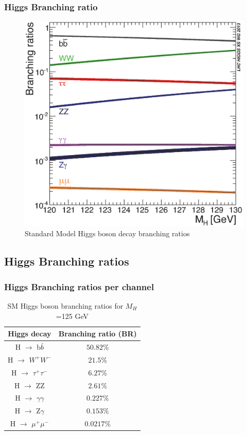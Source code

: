\documentclass[11pt]{beamer}
\begin{document}
\begin{frame}
\frametitle{Higgs Branching ratio}
\begin{center}
	\begin{figure}
		\includegraphics[scale=0.35]{figures/Higgs_BR_120-130_7.eps}
		\caption{Standard Model Higgs boson decay branching ratios}	
	\end{figure}
\end{center}
\end{frame}


\begin{frame}
\section{Higgs Branching ratios }
\frametitle{Higgs Branching ratios per channel}
\begin{table}
	\caption*{SM Higgs boson branching ratios for  $M_H$ =125 GeV}
\begin{center}
\begin{tabular}{|c|c|}
	\hline
	Higgs decay & Branching ratio (BR)\\
	\hline
	H $\rightarrow$ b$\bar{b}$ &
	$50.82\%$ \\
	\hline
	H $\rightarrow$ $W^+W^-$ &
	$21.5\%$ \\
	\hline
	H $\rightarrow$ $\tau^+ \tau^-$ &
	$6.27\%$\\
\hline
	H $\rightarrow$ ZZ &
$2.61\%$\\
\hline
	H $\rightarrow$ $\gamma\gamma$ &
$0.227\%$\\
\hline
	H $\rightarrow$ Z$\gamma$ &
$0.153\%$\\
\hline
	H $\rightarrow$ $\mu^+\mu^-$ &
$0.0217\%$\\
\hline
\end{tabular}
\end{center}
\end{table}

\end{frame}
\end{document}
